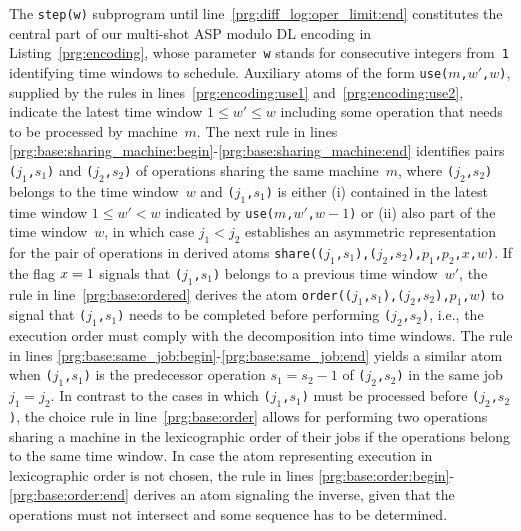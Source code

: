 \documentclass{tlp} %
\begin{document}
The \lstinline{step(w)} subprogram until line~\ref{prg:diff_log:oper_limit:end} 
constitutes the central part of our multi-shot ASP modulo DL encoding in Listing~\ref{prg:encoding}, whose parameter~\lstinline{w} stands for consecutive integers from~\lstinline{1}
identifying time windows to schedule.
Auxiliary atoms of the form \lstinline{use(}$m$\lstinline{,}$w'$\lstinline{,}$w$\lstinline{)},
supplied by the rules in lines~\ref{prg:encoding:use1} and~\ref{prg:encoding:use2},
indicate the latest time window $1\leq w'\leq w$ including some operation that needs
to be processed by machine~$m$.
The next rule in lines \ref{prg:base:sharing_machine:begin}-\ref{prg:base:sharing_machine:end}
identifies pairs \lstinline{(}$j_1$\lstinline{,}$s_1$\lstinline{)} and
\lstinline{(}$j_2$\lstinline{,}$s_2$\lstinline{)} of operations sharing
the same machine~$m$,
where
\lstinline{(}$j_2$\lstinline{,}$s_2$\lstinline{)} belongs to the time window~$w$ and
\lstinline{(}$j_1$\lstinline{,}$s_1$\lstinline{)} is either 
(i)
contained in the latest time window $1\leq w'< w$ indicated by
\lstinline{use(}$m$\lstinline{,}$w'$\lstinline{,}$w-1$\lstinline{)} or
(ii)
also part of the time window~$w$, in which case $j_1 < j_2$ establishes
an asymmetric representation for the pair of operations in derived atoms
\lstinline{share((}$j_1$\lstinline{,}$s_1$\lstinline{),(}$j_2$\lstinline{,}$s_2$\lstinline{),}$p_1$\lstinline{,}$p_2$\lstinline{,}$x$\lstinline{,}$w$\lstinline{)}.
If the flag $x=\text{\lstinline{1}}$ signals that 
\lstinline{(}$j_1$\lstinline{,}$s_1$\lstinline{)}
belongs to a previous time window~$w'$,
the rule in line~\ref{prg:base:ordered} %
derives the atom
\lstinline{order((}$j_1$\lstinline{,}$s_1$\lstinline{),(}$j_2$\lstinline{,}$s_2$\lstinline{),}$p_1$\lstinline{,}$w$\lstinline{)}
to signal that \lstinline{(}$j_1$\lstinline{,}$s_1$\lstinline{)} needs to be completed
before performing \lstinline{(}$j_2$\lstinline{,}$s_2$\lstinline{)}, i.e.,
the execution order must comply with the decomposition into time windows.
The rule in lines \ref{prg:base:same_job:begin}-\ref{prg:base:same_job:end} yields
a similar atom when \lstinline{(}$j_1$\lstinline{,}$s_1$\lstinline{)}
is the predecessor operation $s_1 = s_2-1$ of \lstinline{(}$j_2$\lstinline{,}$s_2$\lstinline{)}
in the same job $j_1=j_2$.
In contrast to the cases in which 
\lstinline{(}$j_1$\lstinline{,}$s_1$\lstinline{)} must be processed before
\lstinline{(}$j_2$\lstinline{,}$s_2$\lstinline{)},
the choice rule in line~\ref{prg:base:order}
allows for performing two operations sharing a machine in the lexicographic order
of their jobs if the operations belong to the same time window.
In case the atom representing execution in lexicographic order is not chosen,
the rule in lines \ref{prg:base:order:begin}-\ref{prg:base:order:end}
derives an atom signaling the inverse, given that the operations must not intersect and some sequence has to be determined.%
%

\end{document}
